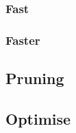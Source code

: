 \documentclass{article}
\begin{document}
\subsubsection{Fast}

\subsubsection{Faster}


\subsection{Pruning}


\subsection{Optimise}

\end{document}
